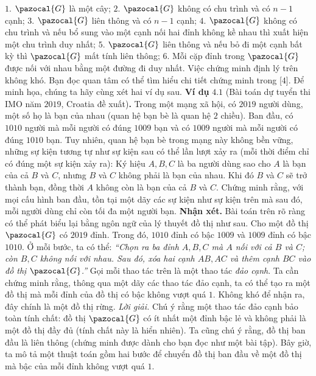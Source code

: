 \begin{multicols}{2}
	\vskip 0.1cm
	$1.$ $\pazocal{G}$ là một cây;
	\vskip 0.1cm
	$2.$ $\pazocal{G}$ không có chu trình và có $n-1$ cạnh;
	\vskip 0.1cm
	$3.$ $\pazocal{G}$ liên thông và có $n-1$ cạnh;
	\vskip 0.1cm
	$4.$ $\pazocal{G}$ không có chu trình và nếu bổ sung vào một cạnh nối hai đỉnh không kề nhau thì xuất hiện một chu trình duy nhất;
	\vskip 0.1cm
	$5.$ $\pazocal{G}$ liên thông và nếu bỏ đi một cạnh bất kỳ thì $\pazocal{G}$ mất tính liên thông;
	\vskip 0.1cm
	$6.$ Mỗi cặp đỉnh trong $\pazocal{G}$ được nối với nhau bằng một đường đi duy nhất.
	\vskip 0.1cm
	Việc chứng minh định lý trên không khó. Bạn đọc quan tâm có thể tìm hiểu chi tiết chứng minh trong [$4$]. Để minh họa, chúng ta hãy cùng xét hai ví dụ sau.
	\vskip 0.1cm
	\textbf{\color{hoccungpi}Ví dụ} $\pmb{4.1}$ (Bài toán dự tuyển thi IMO  năm $2019$, Croatia đề xuất)\textbf{\color{hoccungpi}.}
	Trong một mạng xã hội, có $2019$ người dùng, một số họ là bạn của nhau (quan hệ bạn bè là quan hệ $2$ chiều). Ban đầu, có $1010$ người mà mỗi người có đúng $1009$ bạn và có $1009$ người mà mỗi người có đúng $1010$ bạn. Tuy nhiên, quan hệ bạn bè trong mạng này không bền vững, những sự kiện tương tự như sự kiện sau có thể lần lượt xảy ra (mỗi thời điểm chỉ có đúng một sự kiện xảy ra):
	\vskip 0.1cm
	Ký hiệu $A,B,C$ là ba người dùng sao cho $A$ là bạn của cả $B$ và $C$, nhưng $B$ và $C$ không phải là bạn của nhau. Khi đó $B$ và $C$ sẽ trở thành bạn, đồng thời $A$ không còn là bạn của cả $B$ và $C$.
	\vskip 0.1cm
	Chứng minh rằng, với mọi cấu hình ban đầu, tồn tại một dãy các sự kiện như sự kiện trên mà sau đó, mỗi người dùng chỉ còn tối đa một người bạn.  
	\vskip 0.1cm
	\textbf{\color{hoccungpi}Nhận xét. } Bài toán trên rõ ràng có thể phát biểu lại bằng ngôn ngữ của lý thuyết đồ thị như sau. Cho một đồ thị $\pazocal{G}$ có $2019$ đỉnh. Trong đó, $1010$ đỉnh có bậc $1009$ và $1009$ đỉnh có bậc $1010$. Ở mỗi bước, ta có thể: \textit{``Chọn ra ba đỉnh $A,B,C$ mà $A$ nối với cả $B$ và $C$; còn $B,C$ không nối với nhau. Sau đó, xóa hai cạnh $AB,AC$ và thêm cạnh $BC$ vào đồ thị $\pazocal{G}$.''}
	\vskip 0.1cm
	Gọi mỗi thao tác trên là một thao tác \textit{đảo cạnh}. Ta cần chứng minh rằng, thông qua một dãy các thao tác đảo cạnh, ta có thể tạo ra một đồ thị mà mỗi đỉnh của đồ thị có bậc không vượt quá $1$. Không khó để nhận ra, đây chính là một đồ thị rừng. 
	\vskip 0.1cm
	\textit{Lời giải.}
	Chú ý rằng một thao tác đảo cạnh bảo toàn tính chất: đồ thị $\pazocal{G}$ có ít nhất một đỉnh bậc lẻ và không phải là một đồ thị đầy đủ (tính chất này là hiển nhiên). Ta cũng chú ý rằng, đồ thị ban đầu là liên thông (chứng minh được dành cho bạn đọc như một bài tập). Bây giờ, ta mô tả một thuật toán gồm hai bước để chuyển đồ thị ban đầu về một đồ thị mà bậc của mỗi đỉnh không vượt quá $1$. 

\end{multicols}
